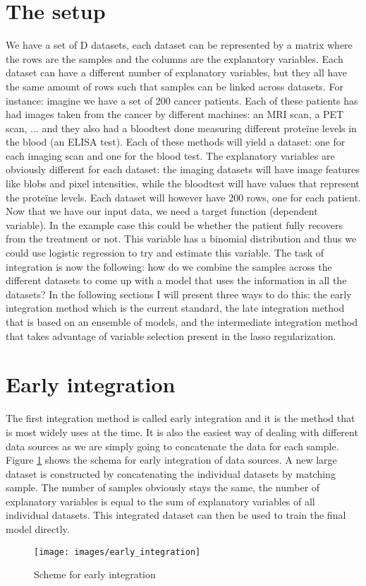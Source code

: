 \section{The setup}
We have a set of D datasets, each dataset can be represented by a matrix where the rows are the samples and the columns are the explanatory variables. Each dataset can have a different number of explanatory variables, but they all have the same amount of rows such that samples can be linked across datasets. For instance: imagine we have a set of 200 cancer patients. Each of these patients has had images taken from the cancer by different machines: an MRI scan, a PET scan, ... and they also had a bloodtest done measuring different prote\"{i}ne levels in the blood (an ELISA test). Each of these methods will yield a dataset: one for each imaging scan and one for the blood test. The explanatory variables are obviously different for each dataset: the imaging datasets will have image features like blobs and pixel intensities, while the bloodtest will have values that represent the prote\"{i}ne levels. Each dataset will however have 200 rows, one for each patient. \\
Now that we have our input data, we need a target function (dependent variable). In the example case this could be whether the patient fully recovers from the treatment or not. This variable has a binomial distribution and thus we could use logistic regression to try and estimate this variable. The task of integration is now the following: how do we combine the samples across the different datasets to come up with a model that uses the information in all the datasets? In the following sections I will present three ways to do this: the early integration method which is the current standard, the late integration method that is based on an ensemble of models, and the intermediate integration method that takes advantage of variable selection present in the lasso regularization.

\section{Early integration}
\label{sec:integration-early}
The first integration method is called early integration and it is the method that is most widely uses at the time. It is also the easiest way of dealing with different data sources as we are simply going to concatenate the data for each sample. Figure \ref{fig:integration-early} shows the schema for early integration of data sources. A new large dataset is constructed by concatenating the individual datasets by matching sample. The number of samples obviously stays the same, the number of explanatory variables is equal to the sum of explanatory variables of all individual datasets. This integrated dataset can then be used to train the final model directly.
\begin{figure}
	\centering
	\texttt{[image: images/early\_integration]}
	\caption{Scheme for early integration}
	\label{fig:integration-early}
\end{figure}

